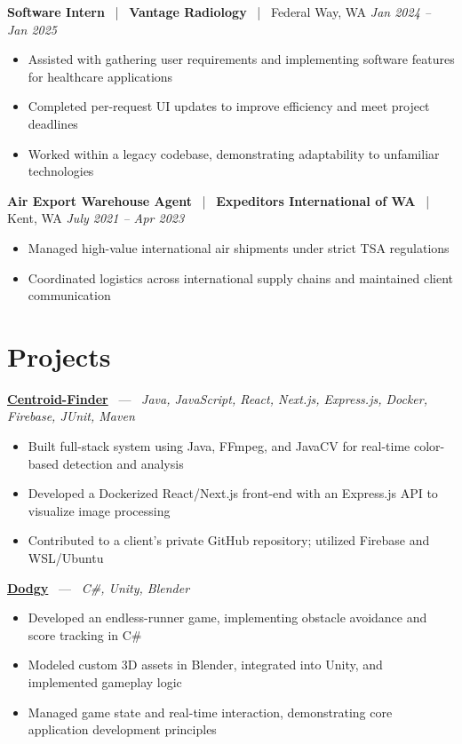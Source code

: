 \documentclass[10pt, letterpaper]{article}
\newcommand{\jobhead}[4]{%
  \vspace{5pt}%
  {\bfseries\color{dark}#1}%
  ~{\color{light}|}~%
  {\bfseries\color{navy}#2}%
  ~{\color{light}|}~%
  {\color{light}#3}%
  \hfill{\color{light}\small\textit{#4}}\\[-2pt]%
}
\newcommand{\projhead}[3]{%
  \vspace{5pt}%
  {\bfseries\color{dark}\href{#2}{#1}}%
  ~{\color{light}---}~%
  {\color{light}\small\textit{#3}}\\[-2pt]%
}
\begin{document}
\jobhead{Software Intern}{Vantage Radiology}{Federal Way, WA}{Jan 2024 – Jan 2025}
\begin{itemize}
  \item Assisted with gathering user requirements and implementing software features for healthcare applications
  \item Completed per-request UI updates to improve efficiency and meet project deadlines
  \item Worked within a legacy codebase, demonstrating adaptability to unfamiliar technologies
\end{itemize}

\jobhead{Air Export Warehouse Agent}{Expeditors International of WA}{Kent, WA}{July 2021 – Apr 2023}
\begin{itemize}
  \item Managed high-value international air shipments under strict TSA regulations
  \item Coordinated logistics across international supply chains and maintained client communication
\end{itemize}

\section{Projects}

\projhead{Centroid-Finder}{https://github.com/xavierb117/centroid-finder}{Java, JavaScript, React, Next.js, Express.js, Docker, Firebase, JUnit, Maven}
\begin{itemize}
  \item Built full-stack system using Java, FFmpeg, and JavaCV for real-time color-based detection and analysis
  \item Developed a Dockerized React/Next.js front-end with an Express.js API to visualize image processing
  \item Contributed to a client's private GitHub repository; utilized Firebase and WSL/Ubuntu
\end{itemize}

\projhead{Dodgy}{https://timyd.itch.io/dodgy}{C\#, Unity, Blender}
\begin{itemize}
  \item Developed an endless-runner game, implementing obstacle avoidance and score tracking in C\#
  \item Modeled custom 3D assets in Blender, integrated into Unity, and implemented gameplay logic
  \item Managed game state and real-time interaction, demonstrating core application development principles
\end{itemize}
\end{document}
